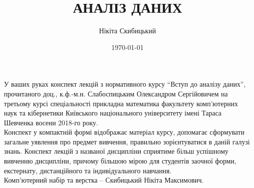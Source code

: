 \documentclass[a4paper, 12pt]{article}
\title{{\Huge АНАЛІЗ ДАНИХ}}
\author{Нікіта Скибицький}
\date{\today}
\begin{document}
\maketitle \thispagestyle{empty} \newpage 
У ваших руках конспект лекцій з нормативного курсу ``Вступ до аналізу даних'', прочитаного доц., к.ф.-м.н. Слабоспицьким Олександром Сергійовичем на третьому курсі спеціальності прикладна математика факультету комп'ютерних наук та кібернетики Київського національного університету імені Тараса Шевченка восени 2018-го року. \\
Конспект у компактній формі відображає матеріал курсу, допомагає сформувати загальне уявлення про предмет вивчення, правильно зорієнтуватися в даній галузі знань. Конспект лекцій з названої дисципліни сприятиме більш успішному вивченню дисципліни, причому більшою мірою для студентів заочної форми, екстернату, дистанційного та індивідуального навчання. \\
Комп'ютерний набір та верстка -- Скибицький Нікіта Максимович. \newpage
\tableofcontents \newpage













\end{document}

